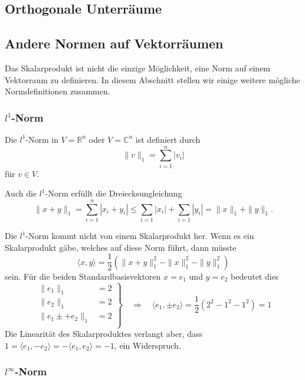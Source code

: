 
\subsection{Orthogonale Unterräume
\label{buch:subsection:orthogonale-unterraeume}}

\subsection{Andere Normen auf Vektorräumen
\label{buch:subsection:andere-normen}}
Das Skalarprodukt ist nicht die einzige Möglichkeit, eine Norm auf einem
Vektorraum zu definieren.
In diesem Abschnitt stellen wir einige weitere mögliche Normdefinitionen
zusammen.

\subsubsection{$l^1$-Norm}
\begin{definition}
Die $l^1$-Norm in $V=\mathbb{R}^n$ oder $V=\mathbb{C}^n$ ist definiert durch
\[
\| v\|_1
=
\sum_{i=1}^n |v_i|
\]
für $v\in V$.
\end{definition}

Auch die $l^1$-Norm erfüllt die Dreiecksungleichung
\[
\|x+y\|_1
=
\sum_{i=1}^n |x_i+y_i|
\le 
\sum_{i=1} |x_i| + \sum_{i=1} |y_i|
=
\|x\|_1 + \|y\|_1.
\]

Die $l^1$-Norm kommt nicht von einem Skalarprodukt her.
Wenn es ein Skalarprodukt gäbe, welches auf diese Norm führt, dann
müsste 
\[
\langle x,y\rangle
=
\frac12(\|x+y\|_1^2-\|x\|_1^2-\|y\|_1^2)
\]
sein.
Für die beiden Standardbasisvektoren $x=e_1$ und $y=e_2$ 
bedeutet dies
\[
\left .
\begin{aligned}
\|e_1\|_1 &= 2\\
\|e_2\|_1 &= 2\\
\|e_1\pm +e_2\|_1 &= 2\\
\end{aligned}
\right\}
\quad\Rightarrow\quad
\langle e_1,\pm e_2\rangle
=
\frac12( 2^2 - 1^2 - 1^2) 
=1
\]
Die Linearität des Skalarproduktes verlangt aber, dass
$1=\langle e_1,-e_2\rangle = -\langle e_1,e_2\rangle = -1$,
ein Widerspruch.

\subsubsection{$l^\infty$-Norm}


